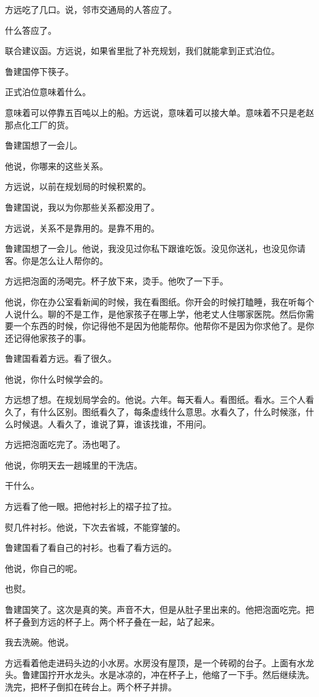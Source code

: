 \documentclass[UTF8,a5paper,11pt,openany]{ctexbook}
\begin{document}
方远吃了几口。说，邻市交通局的人答应了。

什么答应了。

联合建议函。方远说，如果省里批了补充规划，我们就能拿到正式泊位。

鲁建国停下筷子。

正式泊位意味着什么。

意味着可以停靠五百吨以上的船。方远说，意味着可以接大单。意味着不只是老赵那点化工厂的货。

鲁建国想了一会儿。

他说，你哪来的这些关系。

方远说，以前在规划局的时候积累的。

鲁建国说，我以为你那些关系都没用了。

方远说，关系不是靠用的。是靠不用的。

鲁建国想了一会儿。他说，我没见过你私下跟谁吃饭。没见你送礼，也没见你请客。你是怎么让人帮你的。

方远把泡面的汤喝完。杯子放下来，烫手。他吹了一下手。

他说，你在办公室看新闻的时候，我在看图纸。你开会的时候打瞌睡，我在听每个人说什么。聊的不是工作，是他家孩子在哪上学，他老丈人住哪家医院。然后你需要一个东西的时候，你记得他不是因为他能帮你。他帮你不是因为你求他了。是你还记得他家孩子的事。

鲁建国看着方远。看了很久。

他说，你什么时候学会的。

方远想了想。在规划局学会的。他说。六年。每天看人。看图纸。看水。三个人看久了，有什么区别。图纸看久了，每条虚线什么意思。水看久了，什么时候涨，什么时候退。人看久了，谁说了算，谁该找谁，不用问。

方远把泡面吃完了。汤也喝了。

他说，你明天去一趟城里的干洗店。

干什么。

方远看了他一眼。把他衬衫上的褶子拉了拉。

熨几件衬衫。他说，下次去省城，不能穿皱的。

鲁建国看了看自己的衬衫。也看了看方远的。

他说，你自己的呢。

也熨。

鲁建国笑了。这次是真的笑。声音不大，但是从肚子里出来的。他把泡面吃完。把杯子叠到方远的杯子上。两个杯子叠在一起，站了起来。

我去洗碗。他说。

方远看着他走进码头边的小水房。水房没有屋顶，是一个砖砌的台子。上面有水龙头。鲁建国拧开水龙头。水是冰凉的，冲在杯子上，他缩了一下手。然后继续洗。洗完，把杯子倒扣在砖台上。两个杯子并排。
\end{document}
